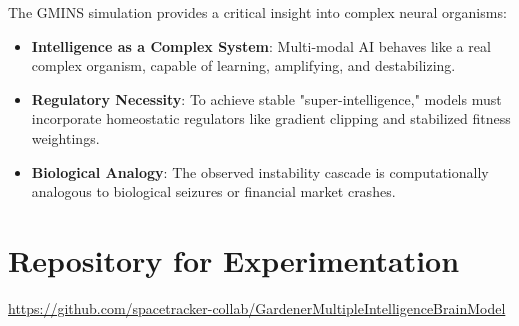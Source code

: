 \documentclass[12pt]{article}
\begin{document}
The GMINS simulation provides a critical insight into complex neural organisms:
\begin{itemize}
\item \textbf{Intelligence as a Complex System}: Multi-modal AI behaves like a real complex organism, capable of learning, amplifying, and destabilizing.
\item \textbf{Regulatory Necessity}: To achieve stable "super-intelligence," models must incorporate homeostatic regulators like gradient clipping and stabilized fitness weightings.
\item \textbf{Biological Analogy}: The observed instability cascade is computationally analogous to biological seizures or financial market crashes.
\end{itemize}

\section{Repository for Experimentation}
\noindent
\url{https://github.com/spacetracker-collab/GardenerMultipleIntelligenceBrainModel}
\end{document}
